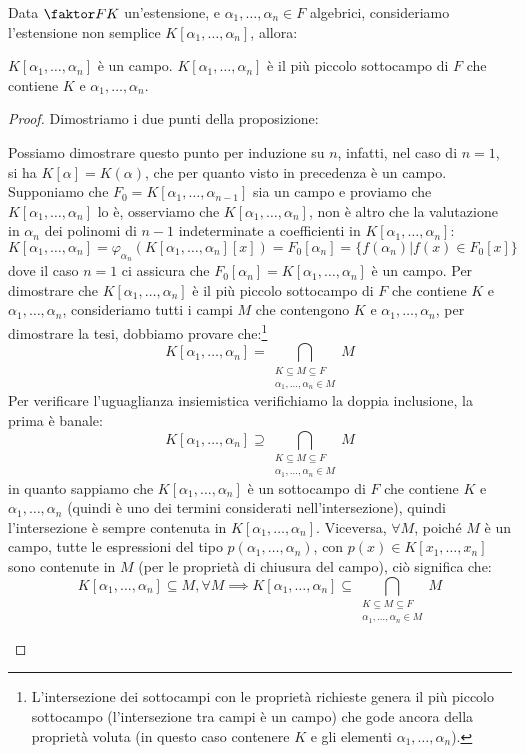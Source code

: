 \documentclass[11pt]{scrartcl}
\begin{document}
\begin{proposition}
Data $\faktor FK$ un'estensione, e $\alpha_1,\ldots,\alpha_n \in F$ algebrici, consideriamo l'estensione non semplice $K[\alpha_1,\ldots,\alpha_n]$, allora:
	\begin{enumerate}[(1)]
	\ii $K[\alpha_1,\ldots,\alpha_n]$ è un campo.
	\ii $K[\alpha_1,\ldots,\alpha_n]$ è il più piccolo sottocampo di $F$ che contiene $K$ e $\alpha_1,\ldots,\alpha_n$.
	\end{enumerate}
\end{proposition}

\begin{proof}
Dimostriamo i due punti della proposizione:
	\begin{enumerate}[(1)]
	\ii Possiamo dimostrare questo punto per induzione su $n$, infatti, nel caso di $n=1$, si ha $K[\alpha] = K(\alpha)$, che per quanto visto in precedenza è un campo. Supponiamo che $F_0 = K[\alpha_1,\ldots,\alpha_{n-1}]$ sia un campo e proviamo che $K[\alpha_1,\ldots,\alpha_n]$ lo è, osserviamo che $K[\alpha_1,\ldots,\alpha_n]$, non è altro che la valutazione in $\alpha_n$ dei polinomi di $n-1$ indeterminate a coefficienti in $K[\alpha_1,\ldots,\alpha_n]$:
		\[ K[\alpha_1,\ldots,\alpha_n] = \varphi_{\alpha_n}(K[\alpha_1,\ldots,\alpha_n][x]) = F_0[\alpha_n]=\{f(\alpha_n) | f(x) \in F_0[x]\}
		\]
		dove il caso $n=1$ ci assicura che $F_0[\alpha_n] = K[\alpha_1,\ldots,\alpha_n]$ è un campo.
	\ii Per dimostrare che $K[\alpha_1,\ldots,\alpha_n]$ è il più piccolo sottocampo di $F$ che contiene $K$ e $\alpha_1,\ldots,\alpha_n$, consideriamo tutti i campi $M$ che contengono $K$ e $\alpha_1,\ldots,\alpha_n$, per dimostrare la tesi, dobbiamo provare che:\footnote{L'intersezione dei sottocampi con le proprietà richieste genera il più piccolo sottocampo (l'intersezione tra campi è un campo) che gode ancora della proprietà voluta (in questo caso contenere $K$ e gli elementi $\alpha_1,\ldots,\alpha_n$).}
		\[ K[\alpha_1,\ldots,\alpha_n] = \bigcap_{\substack{K \subseteq M \subseteq F \\ \alpha_1,\ldots,\alpha_n \in M}}M
		\]
Per verificare l'uguaglianza insiemistica verifichiamo la doppia inclusione, la prima è banale:
	\[  K[\alpha_1,\ldots,\alpha_n] \supseteq \bigcap_{\substack{K \subseteq M \subseteq F \\ \alpha_1,\ldots,\alpha_n \in M}}M
	\]
in quanto sappiamo che $K[\alpha_1,\ldots,\alpha_n]$ è un sottocampo di $F$ che contiene $K$ e $\alpha_1,\ldots,\alpha_n$ (quindi è uno dei termini considerati nell'intersezione), quindi l'intersezione è sempre contenuta in $K[\alpha_1,\ldots,\alpha_n]$.
Viceversa, $\forall M$, poiché $M$ è un campo, tutte le espressioni del tipo $p(\alpha_1,\ldots,\alpha_n)$, con $p(x) \in K[x_1,\ldots,x_n]$ sono contenute in $M$ (per le proprietà di chiusura del campo), ciò significa che:
	\[ K[\alpha_1,\ldots,\alpha_n] \subseteq M, \forall M \implies K[\alpha_1,\ldots,\alpha_n] \subseteq \bigcap_{\substack{K \subseteq M \subseteq F \\ \alpha_1,\ldots,\alpha_n \in M}}M
	\]
	\end{enumerate}
\end{proof}
\end{document}
